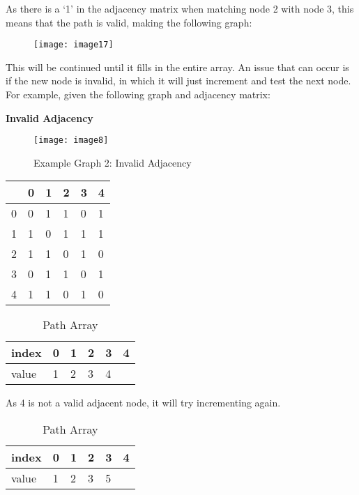 As there is a ‘1’ in the adjacency matrix when matching node 2 with node 3, this
means that the path is valid, making the following graph:

\begin{figure}[H]
    \centering
    \texttt{[image: image17]}
\end{figure}

This will be continued until it fills in the entire array. An issue that can
occur is if the new node is invalid, in which it will just increment and test
the next node. For example, given the following graph and adjacency matrix:

\textbf{Invalid Adjacency}

\begin{figure}[H]
    \centering
    \texttt{[image: image8]}
    \caption{Example Graph 2: Invalid Adjacency}
\end{figure}

\begin{table}[H]
    \centering
    \begin{tabular}{l | lllll}
          & 0 & 1 & 2 & 3 & 4  \\
        \hline
        0 & 0 & 1 & 1 & 0 & 1  \\
        1 & 1 & 0 & 1 & 1 & 1  \\
        2 & 1 & 1 & 0 & 1 & 0  \\
        3 & 0 & 1 & 1 & {\cellcolor[rgb]{0.933,0.804,0.804}}0 & 1  \\
        4 & 1 & 1 & 0 & 1 & 0 
    \end{tabular}
\end{table}

\begin{table}[H]
    \centering
    \caption{Path Array}
    \begin{tabular}{l | lllll}
        index & 0 & 1 & 2 & 3 & 4  \\
        \hline
        value & 1 & 2 & 3 & {\cellcolor[rgb]{0.933,0.804,0.804}}4 &  \\
    \end{tabular}
\end{table}

As 4 is not a valid adjacent node, it will try incrementing again.

\begin{table}[H]
    \centering
    \caption{Path Array}
    \begin{tabular}{l | lllll}
        index & 0 & 1 & 2 & 3 & 4  \\
        \hline
        value & 1 & 2 & 3 & 5 &  \\
    \end{tabular}
\end{table}

